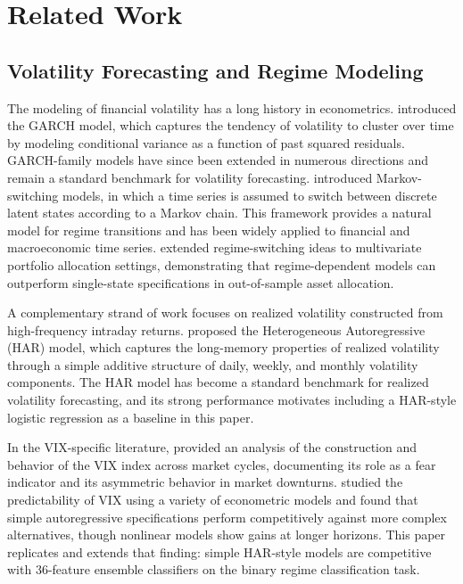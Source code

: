 \documentclass[11pt]{article}
\begin{document}
\section{Related Work}
\label{sec:related}

\subsection{Volatility Forecasting and Regime Modeling}

The modeling of financial volatility has a long history in econometrics. \citet{bollerslev1986} introduced the GARCH model, which captures the tendency of volatility to cluster over time by modeling conditional variance as a function of past squared residuals. GARCH-family models have since been extended in numerous directions and remain a standard benchmark for volatility forecasting. \citet{hamilton1989} introduced Markov-switching models, in which a time series is assumed to switch between discrete latent states according to a Markov chain. This framework provides a natural model for regime transitions and has been widely applied to financial and macroeconomic time series. \citet{guidolin2007} extended regime-switching ideas to multivariate portfolio allocation settings, demonstrating that regime-dependent models can outperform single-state specifications in out-of-sample asset allocation.

A complementary strand of work focuses on realized volatility constructed from high-frequency intraday returns. \citet{corsi2009} proposed the Heterogeneous Autoregressive (HAR) model, which captures the long-memory properties of realized volatility through a simple additive structure of daily, weekly, and monthly volatility components. The HAR model has become a standard benchmark for realized volatility forecasting, and its strong performance motivates including a HAR-style logistic regression as a baseline in this paper.

In the VIX-specific literature, \citet{whaley2009} provided an analysis of the construction and behavior of the VIX index across market cycles, documenting its role as a fear indicator and its asymmetric behavior in market downturns. \citet{fernandes2014} studied the predictability of VIX using a variety of econometric models and found that simple autoregressive specifications perform competitively against more complex alternatives, though nonlinear models show gains at longer horizons. This paper replicates and extends that finding: simple HAR-style models are competitive with 36-feature ensemble classifiers on the binary regime classification task.
\end{document}
